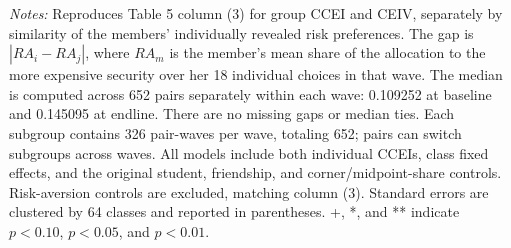 \documentclass[11pt]{article}
\begin{document}
\small
\textit{Notes:} Reproduces Table 5 column (3) for group CCEI and CEIV, separately
by similarity of the members' individually revealed risk preferences.
The gap is $|RA_i-RA_j|$, where $RA_m$ is the member's mean share of the allocation
to the more expensive security over her 18 individual choices in that wave.
The median is computed across 652 pairs separately within each wave:
0.109252 at baseline and 0.145095 at endline. There are no missing gaps or median ties. Each subgroup contains 326
pair-waves per wave, totaling 652; pairs can switch subgroups across waves.
All models include both individual CCEIs, class fixed effects, and the original
student, friendship, and corner/midpoint-share controls. Risk-aversion controls
are excluded, matching column (3). Standard errors are clustered by 64 classes
and reported in parentheses. +, *, and ** indicate $p<0.10$, $p<0.05$, and $p<0.01$.
\end{document}
